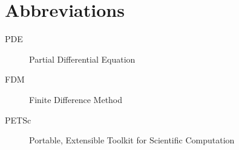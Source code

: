 \chapter{Abbreviations}

\begin{description}
	\item[PDE] Partial Differential Equation
	\item[FDM] Finite Difference Method
	\item[PETSc] Portable, Extensible Toolkit for Scientific Computation
\end{description}
